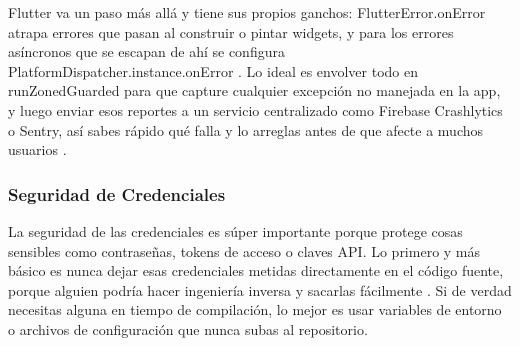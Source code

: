 Flutter va un paso más allá y tiene sus propios ganchos: FlutterError.onError atrapa errores que pasan al construir o pintar widgets, y para los errores asíncronos que se escapan de ahí se configura PlatformDispatcher.instance.onError \cite{FlutterDocManejoErrores}. Lo ideal es envolver todo en runZonedGuarded para que capture cualquier excepción no manejada en la app, y luego enviar esos reportes a un servicio centralizado como Firebase Crashlytics o Sentry, así sabes rápido qué falla y lo arreglas antes de que afecte a muchos usuarios \cite{MediumArquitecturaManejoErrores}.

\subsubsection{Seguridad de Credenciales}
La seguridad de las credenciales es súper importante porque protege cosas sensibles como contraseñas, tokens de acceso o claves API. Lo primero y más básico es nunca dejar esas credenciales metidas directamente en el código fuente, porque alguien podría hacer ingeniería inversa y sacarlas fácilmente \cite{OWASPMobileTop10}. Si de verdad necesitas alguna en tiempo de compilación, lo mejor es usar variables de entorno o archivos de configuración que nunca subas al repositorio.